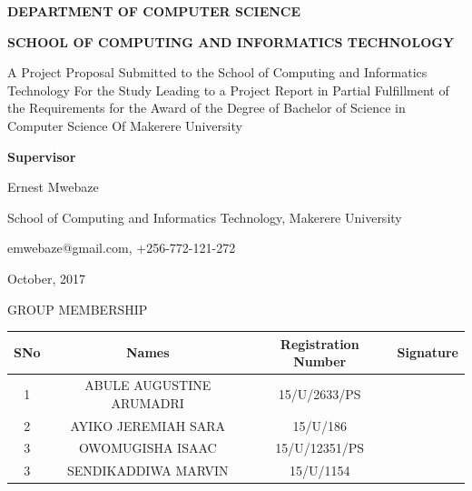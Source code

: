 \documentclass[12pt]{article}
\begin{document}
	\begin{center} \begin{Large} \textbf {DEPARTMENT OF COMPUTER SCIENCE} \end{Large}  \end{center}
	\begin{center} \begin{Large} \textbf {SCHOOL OF COMPUTING AND INFORMATICS TECHNOLOGY\\[1in]} \end{Large}  \end{center}
	\begin{center}A Project Proposal Submitted to the School of Computing and Informatics Technology
For the Study Leading to a Project Report in Partial Fulfillment of the
Requirements for the Award of the Degree of Bachelor of Science in Computer Science
Of Makerere University  \end{center}
\begin{center} \begin{large} \textbf { Supervisor} \end{large}  \end{center}
\begin{center} \begin{large} Ernest Mwebaze \end{large}  \end{center}	
\begin{center} \begin{large} School of Computing and Informatics Technology, Makerere University \end{large}  \end{center}
\begin{center} \begin{large} emwebaze@gmail.com, +256-772-121-272 \end{large}  \end{center}
\begin{center} \begin{large}October, 2017 \end{large}  \end{center}
\newpage
\begin{center}\begin{Large}GROUP MEMBERSHIP \end{Large} \end{center}

\begin{tabular} {|c|c|c|c|}
\hline
SNo & Names & Registration  Number & Signature \\ \hline
1 & ABULE AUGUSTINE ARUMADRI &  15/U/2633/PS &  \\ \hline
2 & AYIKO JEREMIAH SARA &  15/U/186 & \\ \hline
3 & OWOMUGISHA ISAAC &  15/U/12351/PS & \\ \hline
3 & SENDIKADDIWA MARVIN &  15/U/1154 & \\ \hline
\end{tabular}
\newpage
\tableofcontents
\newpage
\end{document}
